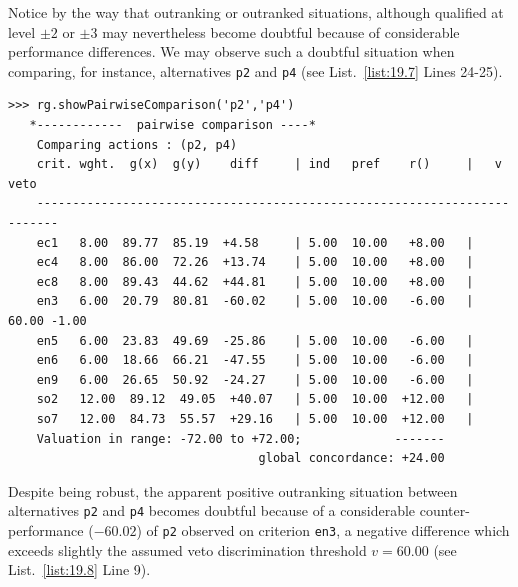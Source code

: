 Notice by the way that outranking or outranked situations, although qualified at level $\pm 2$ or $\pm 3$ may nevertheless become doubtful because of considerable performance differences. We may observe such a doubtful situation when comparing, for instance, alternatives \texttt{p2} and \texttt{p4} (see List.~\vref{list:19.7} Lines 24-25).
\begin{lstlisting}[caption={Comparing alternatives \texttt{p2} and \texttt{p4}},label=list:19.8,basicstyle=\ttfamily\scriptsize]
>>> rg.showPairwiseComparison('p2','p4')
   *------------  pairwise comparison ----*
    Comparing actions : (p2, p4)
    crit. wght.  g(x)  g(y)    diff  	| ind   pref    r() 	|   v    veto
    -------------------------------------------------------------------------
    ec1   8.00  89.77  85.19  +4.58 	| 5.00  10.00   +8.00 	| 
    ec4   8.00  86.00  72.26  +13.74 	| 5.00  10.00   +8.00 	| 
    ec8   8.00  89.43  44.62  +44.81 	| 5.00  10.00   +8.00 	| 
    en3   6.00  20.79  80.81  -60.02 	| 5.00  10.00   -6.00 	| 60.00 -1.00
    en5   6.00  23.83  49.69  -25.86 	| 5.00  10.00   -6.00 	| 
    en6   6.00  18.66  66.21  -47.55 	| 5.00  10.00   -6.00 	| 
    en9   6.00  26.65  50.92  -24.27 	| 5.00  10.00   -6.00 	| 
    so2   12.00  89.12  49.05  +40.07 	| 5.00  10.00  +12.00 	| 
    so7   12.00  84.73  55.57  +29.16 	| 5.00  10.00  +12.00   |
    Valuation in range: -72.00 to +72.00;             -------
                                   global concordance: +24.00      
\end{lstlisting}

Despite being robust, the apparent positive outranking situation between alternatives \texttt{p2} and \texttt{p4} becomes doubtful because of a considerable counter-performance ($-60.02$) of \texttt{p2} observed on criterion \texttt{en3}, a negative difference which exceeds slightly the assumed veto discrimination threshold $v = 60.00$ (see List.~\vref{list:19.8} Line 9).

